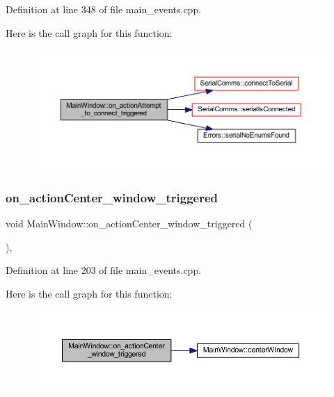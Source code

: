 Definition at line 348 of file main\+\_\+events.\+cpp.

Here is the call graph for this function\+:
\nopagebreak
\begin{figure}[H]
\begin{center}
\leavevmode
\includegraphics[width=350pt]{classMainWindow_aea8024d64cc8d8b805b66a45524e753e_cgraph}
\end{center}
\end{figure}
\mbox{\label{classMainWindow_a6ced641b27821f153cd80aef4719fe41}} 
\subsubsection{\texorpdfstring{on\_actionCenter\_window\_triggered}{on\_actionCenter\_window\_triggered}}
{\footnotesize\ttfamily void Main\+Window\+::on\+\_\+action\+Center\+\_\+window\+\_\+triggered (\begin{DoxyParamCaption}{ }\end{DoxyParamCaption})\hspace{0.3cm}{\ttfamily [private]}, {\ttfamily [slot]}}



Definition at line 203 of file main\+\_\+events.\+cpp.

Here is the call graph for this function\+:
\nopagebreak
\begin{figure}[H]
\begin{center}
\leavevmode
\includegraphics[width=350pt]{classMainWindow_a6ced641b27821f153cd80aef4719fe41_cgraph}
\end{center}
\end{figure}
\mbox{\label{classMainWindow_aa6925b9f63240473ebb0baeb0caf51d5}} 
